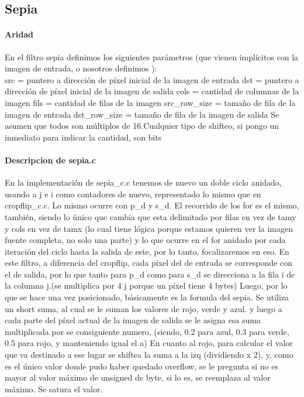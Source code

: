 \documentclass[a4paper]{article}
\begin{document}
     
          
     
     
     
     
      
       
      
 
          
         
\subsection{Sepia}
\paragraph{\textbf{Aridad}}
\hfill \break
En el filtro sepia definimos los  siguientes parámetros (que vienen implícitos con la imagen de entrada, o nosotros definimos ):
\hfill \break
\\
src = puntero a dirección de píxel inicial de la imagen de entrada
\hfill \break
dst = puntero a dirección de píxel inicial de la imagen de salida
\hfill \break
cols = cantidad de columnas de la imagen
fils = cantidad de filas de la imagen
src_row_size = tamaño de fila de la imagen de entrada
dst_row_size = tamaño de fila de la imagen de salida 
Se asumen que todos son múltiplos de 16.Cualquier tipo de shifteo, si pongo un inmediato para indicar la cantidad, son bits
\paragraph{\textbf{Descripcion de sepia.c}}
\hfill \break
        En la implementación de sepia_c.c tenemos de nuevo un doble ciclo anidado, usando a j e i como contadores de nuevo, representado lo mismo que en cropflip_c.c. Lo mismo ocurre con p_d y s_d. El recorrido de los for es el mismo, también, siendo lo único que cambia que esta delimitado por filas en vez de tamy y cols en vez de tamx (lo cual tiene lógica porque estamos quieren ver la imagen fuente completa, no solo una parte) y  lo que ocurre en el for anidado por cada iteración del ciclo hasta la salida de este, por lo tanto, focalizaremos en eso.
        \hfill \break
        En este filtro, a diferencia del cropflip, cada píxel del de entrada se corresponde con el de salida, por lo que tanto para p_d como para s_d se direcciona a la fila i de la columna j.(se multiplica por 4 j porque un píxel tiene 4 bytes)
        \hfill \break
        Luego, por lo que se hace una vez posicionado, básicamente es la formula del sepia. Se utiliza un short suma, al cual se le suman los valores de rojo, verde y azul. y luego a cada parte del píxel actual de la imagen de salida se le asigna esa suma multiplicada por se consiguiente numero. (siendo, 0.2 para azul, 0.3 para verde, 0.5 para rojo, y manteniendo igual el a)
        \hfill \break
        En cuanto al rojo, para calcular el valor que va destinado a ese lugar se shiftea la suma a la izq (dividiendo x 2), y, como es el único valor donde pudo haber quedado overflow, se le pregunta si no es mayor al valor máximo de unsigned de byte, si lo es, se reemplaza al valor máximo. Se satura el valor.
        \hfill \break
        
\end{document}
